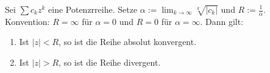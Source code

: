Sei $\sum c_k z^k$ eine Potenzrreihe. Setze $\alpha := \lim_{k \to \infty} \sqrt[k]{|c_k|}$ und $R := \frac{1}{\alpha}$. Konvention: $R = \infty$ für $\alpha = 0$ und $R = 0$ für $\alpha = \infty$. Dann gilt:
\begin{enumerate}[label=\alph*)]
    \item Ist $|z| < R$, so ist die Reihe absolut konvergent.
    \item Ist $|z| > R$, so ist die Reihe divergent.
\end{enumerate}